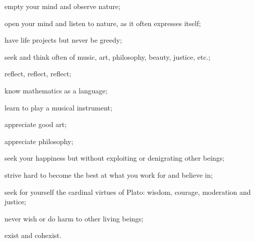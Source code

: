 \documentclass{book}
\begin{document}
empty your mind and observe nature;

open your mind and listen to nature, as it often expresses itself;

have life projects but never be greedy;

seek and think often of music, art, philosophy, beauty, justice, etc.;

reflect, reflect, reflect;

know mathematics as a language;

learn to play a musical instrument;

appreciate good art;

appreciate philosophy;

seek your happiness but without exploiting or denigrating other beings;

strive hard to become the best at what you work for and believe in;

seek for yourself the cardinal virtues of Plato: wisdom, courage, moderation and justice;

never wish or do harm to other living beings;

exist and cohexist.
\end{document}

